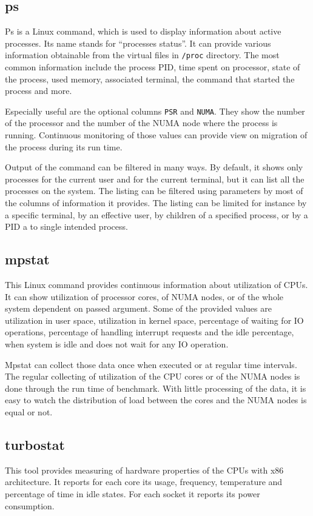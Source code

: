 \subsection{ps}
Ps is a Linux command, which is used to display information about active processes. Its name
stands for ``processes status''. It can provide various information obtainable from
the virtual files in \texttt{/proc} directory. The most common information
include the process PID, time spent on processor, state of the process, used memory,
associated terminal, the command that started the process and more.

Especially useful are the optional columns \texttt{PSR} and \texttt{NUMA}. They
show the number of the processor and the number of the NUMA node where the process is
running. Continuous monitoring of those values can provide view on migration of
the process during its run time. 

Output of the command can be filtered in many ways. By default, it shows only
processes for the current user and for the current terminal, but it can list all
the processes on the system. The listing can be filtered using parameters by
most of the columns of information it provides. The listing can be limited for
instance by a specific terminal, by an effective user, by children of a specified process,
or by a PID a to single intended process.

\subsection{mpstat}
This Linux command provides continuous information about utilization of CPUs. It
can show utilization of processor cores, of NUMA nodes, or of the whole system
dependent on passed argument. Some of the provided values are utilization in
user space, utilization in kernel space, percentage of waiting for IO
operations, percentage of handling interrupt requests and the idle percentage,
when system is idle and does not wait for any IO operation.

Mpstat can collect those data once when executed or at regular time intervals.
The regular collecting of utilization of the CPU cores or of the NUMA nodes is
done through the run time of benchmark. With little processing of the data, it
is easy to watch the distribution of load between the cores and the NUMA nodes
is equal or not.

\subsection{turbostat}
This tool provides measuring of hardware properties of the CPUs with x86
architecture. It reports for each core its usage, frequency, temperature and
percentage of time in idle states. For each socket it reports its power consumption.

